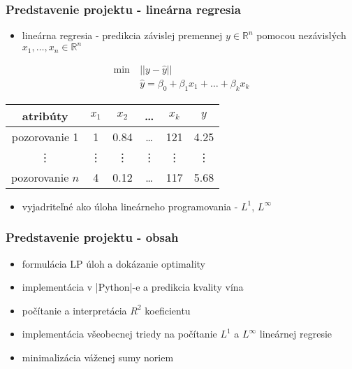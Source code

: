 \documentclass[presentation.tex]{subfiles}
\begin{document}
\begin{frame}

\frametitle{Predstavenie projektu - lineárna regresia}
\begin{itemize}
	\item lineárna regresia - predikcia závislej premennej $y \in \mathbb{R}^n$ pomocou nezávislých $x_1,\dots,x_n \in \mathbb{R}^n$
\end{itemize}
\begin{align*}
	\min~&||y - \hat{y}|| \\
	&\hat{y} = \beta_0 + \beta_1x_1 + \dots + \beta_kx_k
\end{align*}

\begin{center}
	\small
	\begin{tabular}{| c || c | c | c | c | c |}
		\hline
		atribúty & $x_1$ & $x_2$ & \dots & $x_k$ & $y$ \\
		\hline
		pozorovanie 1 & 1 & 0.84 & \dots & 121 & 4.25 \\
		\hline
		\vdots & \vdots & \vdots & \vdots & \vdots & \vdots \\
		\hline
		pozorovanie $n$ & 4 & 0.12 & \dots & 117 & 5.68 \\
		\hline
	\end{tabular}
\end{center}

\begin{itemize}
	\item vyjadriteľné ako úloha lineárneho programovania - $L^1$, $L^{\infty}$
\end{itemize}

\end{frame}

\begin{frame}
	\frametitle{Predstavenie projektu - obsah}

\begin{itemize}
	\item formulácia LP úloh a dokázanie optimality 
	\item implementácia v \pyth|Python|-e a predikcia kvality vína
	\item počítanie a interpretácia $R^2$ koeficientu
	\item implementácia všeobecnej triedy na počítanie $L^1$ a $L^{\infty}$ lineárnej regresie
	\item minimalizácia váženej sumy noriem
\end{itemize}

\end{frame}


	
\end{document}
